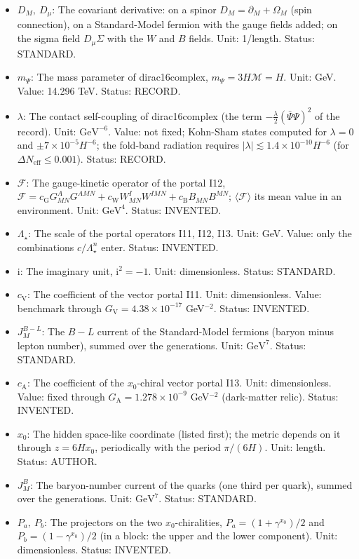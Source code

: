 \documentclass[
  10pt,
]{article}
\begin{document}
\begin{itemize}
  copy \(M_1, M_2, \dots\)): it runs over \(x_0, x_1, \dots, x_7\); a
  repeated index is summed. Status: STANDARD.
\item
  \(D_M,\ D_\mu\): The covariant derivative: on a spinor
  \(D_M = \partial_M + \Omega_M\) (spin connection), on a Standard-Model
  fermion with the gauge fields added; on the sigma field
  \(D_\mu\Sigma\) with the \(W\) and \(B\) fields. Unit: 1/length.
  Status: STANDARD.
\item
  \(m_\Psi\): The mass parameter of dirac16complex,
  \(m_\Psi = 3H\mathcal{M} = H\). Unit: GeV. Value: 14.296 TeV. Status:
  RECORD.
\item
  \(\lambda\): The contact self-coupling of dirac16complex (the term
  \(-\frac{\lambda}{2}(\bar\Psi\Psi)^2\) of the record). Unit:
  \(\mathrm{GeV}^{-6}\). Value: not fixed; Kohn-Sham states computed for
  \(\lambda = 0\) and \(\pm7\times10^{-5}H^{-6}\); the fold-band
  radiation requires
  \(\lvert\lambda\rvert \lesssim 1.4\times10^{-10}H^{-6}\) (for
  \(\Delta N_{\mathrm{eff}} \le 0.001\)). Status: RECORD.
\item
  \(\mathcal{F}\): The gauge-kinetic operator of the portal I12,
  \(\mathcal{F} = c_{\mathrm{G}}G^A_{MN}G^{AMN} + c_{\mathrm{W}}W^I_{MN}W^{IMN} + c_{\mathrm{B}}B_{MN}B^{MN}\);
  \(\langle\mathcal{F}\rangle\) its mean value in an environment. Unit:
  \(\mathrm{GeV}^{4}\). Status: INVENTED.
\item
  \(\Lambda_\star\): The scale of the portal operators I11, I12, I13.
  Unit: GeV. Value: only the combinations \(c/\Lambda_\star^n\) enter.
  Status: INVENTED.
\item
  \(\mathrm{i}\): The imaginary unit, \(\mathrm{i}^2 = -1\). Unit:
  dimensionless. Status: STANDARD.
\item
  \(c_{\mathrm{V}}\): The coefficient of the vector portal I11. Unit:
  dimensionless. Value: benchmark through
  \(G_{\mathrm{V}} = 4.38\times10^{-17}\) GeV\(^{-2}\). Status:
  INVENTED.
\item
  \(J^{B-L}_M\): The \(B - L\) current of the Standard-Model fermions
  (baryon minus lepton number), summed over the generations. Unit:
  \(\mathrm{GeV}^{7}\). Status: STANDARD.
\item
  \(c_{\mathrm{A}}\): The coefficient of the \(x_0\)-chiral vector
  portal I13. Unit: dimensionless. Value: fixed through
  \(G_{\mathrm{A}} = 1.278\times10^{-9}\) GeV\(^{-2}\) (dark-matter
  relic). Status: INVENTED.
\item
  \(x_0\): The hidden space-like coordinate (listed first); the metric
  depends on it through \(z = 6Hx_0\), periodically with the period
  \(\pi/(6H)\). Unit: length. Status: AUTHOR.
\item
  \(J^{B}_M\): The baryon-number current of the quarks (one third per
  quark), summed over the generations. Unit: \(\mathrm{GeV}^{7}\).
  Status: STANDARD.
\item
  \(P_a,\ P_b\): The projectors on the two \(x_0\)-chiralities,
  \(P_a = (1 + \gamma^{x_0})/2\) and \(P_b = (1 - \gamma^{x_0})/2\) (in
  a block: the upper and the lower component). Unit: dimensionless.
  Status: INVENTED.
\end{itemize}
\end{document}
